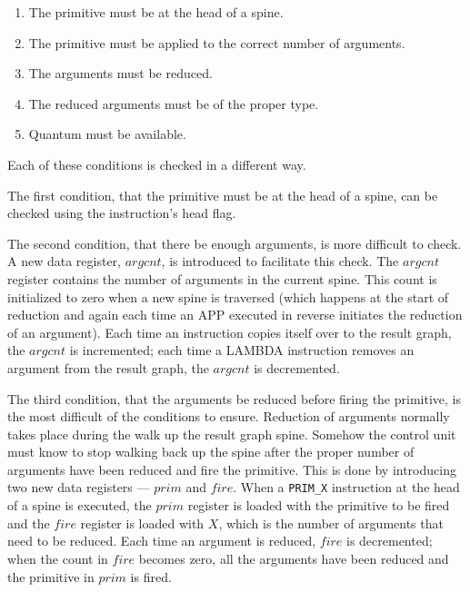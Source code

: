 \begin{enumerate}
\item The primitive must be at the head of a spine.

\item The primitive must be applied to the correct number of arguments.

\item The arguments must be reduced.

\item The reduced arguments must be of the proper type.

\item Quantum must be available.
\end{enumerate}

Each of these conditions is checked in a different way.

The first condition, that the primitive must be at the head of a spine, can be checked using the instruction's head flag.

The second condition, that there be enough arguments, is more difficult to check. A new
data register, \(argcnt\), is introduced to facilitate this check. The \(argcnt\)
register contains the number of arguments in the current spine. This count is initialized
to zero when a new spine is traversed (which happens at the start of reduction and again
each time an APP executed in reverse initiates the reduction of an argument). Each time an
instruction copies itself over to the result graph, the \(argcnt\) is incremented; each
time a LAMBDA instruction removes an argument from the result graph, the \(argcnt\) is
decremented.

The third condition, that the arguments be reduced before firing the primitive, is the
most difficult of the conditions to ensure. Reduction of arguments normally takes place
during the walk up the result graph spine. Somehow the control unit must know to stop
walking back up the spine after the proper number of arguments have been reduced and fire
the primitive. This is done by introducing two new data registers --- \(prim\) and
\(fire\). When a \texttt{PRIM\_X} instruction at the head of a spine is executed, the \(prim\)
register is loaded with the primitive to be fired and the \(fire\) register is loaded
with \(X\), which is the number of arguments that need to be reduced. Each time an argument
is reduced, \(fire\) is decremented; when the count in \(fire\) becomes zero, all the
arguments have been reduced and the primitive in \(prim\) is fired.

